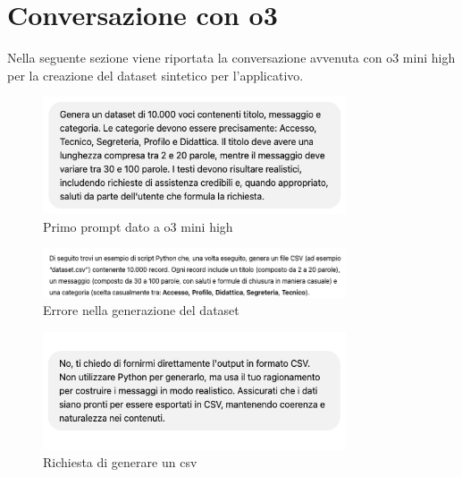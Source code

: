 \section{Conversazione con o3}
Nella seguente sezione viene riportata la conversazione avvenuta con o3 mini high per la creazione del dataset sintetico per l'applicativo.
\begin{figure}[H]
    \centering
    \includegraphics[width=0.8\textwidth]{images/firstPrompt.png}
    \caption{Primo prompt dato a o3 mini high}
    \label{fig:firstPrompt1}
\end{figure}
\begin{figure}[H]
    \centering
    \includegraphics[width=0.8\textwidth]{images/pythonError.png}
    \caption{Errore nella generazione del dataset}
    \label{fig:firstPrompt}
\end{figure}
\begin{figure}[H]
    \centering
    \includegraphics[width=0.8\textwidth]{images/csvPrompt.png}
    \caption{Richiesta di generare un csv}
    \label{fig:firstPrompt}
\end{figure}
